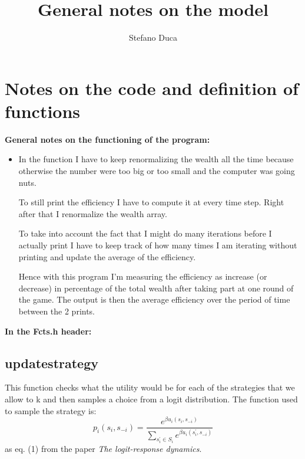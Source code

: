 \documentclass{article}
\author{Stefano Duca}
\title{General notes on the model}
\begin{document}
\maketitle

\section*{Notes on the code and definition of functions}
\textbf{General notes on the functioning of the program:}

\begin{itemize}

\item In the function I have to keep renormalizing the wealth all the time because otherwise the number were too big or too small and the computer was going nuts.

To still print the efficiency I have to compute it at every time step. Right after that I renormalize the wealth array.

To take into account the fact that I might do many iterations before I actually print I have to keep track of how many times I am iterating without printing and update the average of the efficiency.

Hence with this program I'm measuring the efficiency as increase (or decrease) in percentage of the total wealth after taking part at one round of the game.
The output is then the average efficiency over the period of time between the 2 prints.

\end{itemize}


\textbf{In the Fcts.h header:}

\subsection*{updatestrategy}
This function checks what the utility would be for each of the strategies that we allow to k and then samples a choice from a logit distribution.
The function used to sample the strategy is:
$$ p_{i}\left(s_{i},s_{-i}\right)=\frac{e^{\beta u_{i}\left(s_{i},s_{-i}\right)}}{\sum_{s_{i}^{'}\in S_{i}}e^{\beta u_{i}\left(s_{i}^{'},s_{-i}\right)}} $$
as eq. (1) from the paper \textit{The logit-response dynamics}.
\end{document}
